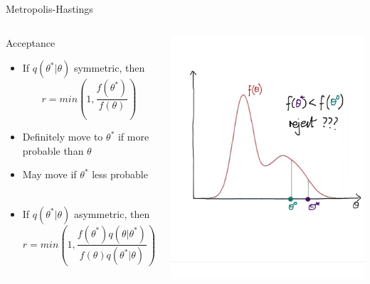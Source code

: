 \documentclass[compress]{beamer}
\begin{document}
\begin{frame}[label=sec-7-8]{Metropolis-Hastings}
    \begin{columns}[c] 
    \begin{block}{Acceptance}
        \begin{itemize}
            \item If $q(\theta^*|\theta)$ symmetric, then 
            $$ r = min \left( 1,\dfrac{f(\theta^*)}{f(\theta)} \right)$$ 
            \item Definitely move to $\theta^*$ if more probable than $\theta$ 
            \item May move if $\theta^*$ less probable \\~\\
            \item If $q(\theta^*|\theta)$ asymmetric, then $$ r = min \left( 1,\dfrac{f(\theta^*)q(\theta|\theta^*)}{f(\theta)q(\theta^*|\theta)} \right)$$
        \end{itemize}
    \end{block}

    \includegraphics[width=1\linewidth]{MH4}
\end{columns}
\end{frame}
\end{document}
